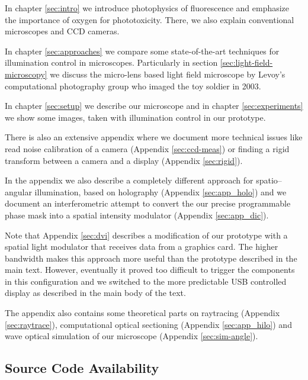 \documentclass[oneside,a4paper,12pt,BCOR20mm,DIV14]{scrbook}
\begin{document}
In chapter \ref{sec:intro} we introduce photophysics of fluorescence
and emphasize the importance of oxygen for phototoxicity. There, we
also explain conventional microscopes and CCD cameras.

In chapter \ref{sec:approaches} we compare some state-of-the-art
techniques for illumination control in microscopes. %
Particularly in section \ref{sec:light-field-microscopy} we discuss
the micro-lens based light field microscope by Levoy's computational
photography group who imaged the toy soldier in 2003.

In chapter \ref{sec:setup} we describe our microscope and in chapter
\ref{sec:experiments} we show some images, taken with illumination
control in our prototype.

There is also an extensive appendix where we document more technical
issues like read noise calibration of a camera (Appendix
\ref{sec:ccd-meas}) or finding a rigid transform between a camera and
a display (Appendix \ref{sec:rigid}).

In the appendix we also describe a completely different approach for
spatio--angular illumination, based on holography (Appendix
\ref{sec:app_holo}) and we document an interferometric attempt to
convert the our precise programmable phase mask into a spatial
intensity modulator (Appendix \ref{sec:app_dic}).

Note that Appendix \ref{sec:dvi} describes a modification of our
prototype with a spatial light modulator that receives data from a
graphics card. The higher bandwidth makes this approach more useful
than the prototype described in the main text. However, eventually it
proved too difficult to trigger the components in this configuration
and we switched to the more predictable USB controlled display as
described in the main body of the text.
 
The appendix also contains some theoretical parts on raytracing
(Appendix \ref{sec:raytrace}), computational optical sectioning
(Appendix \ref{sec:app_hilo}) and wave optical simulation of our
microscope (Appendix \ref{sec:sim-angle}).

\subsection*{Source Code Availability}
\end{document}
